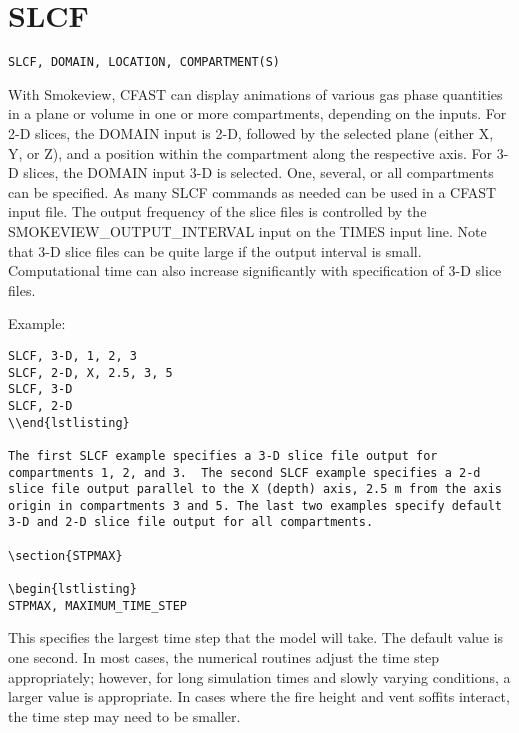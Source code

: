 \section{SLCF}

\begin{lstlisting}
SLCF, DOMAIN, LOCATION, COMPARTMENT(S)
\end{lstlisting}

With Smokeview, CFAST can display animations of various gas phase quantities in a plane or volume in one or more compartments, depending on the inputs. For 2-D slices, the DOMAIN input is 2-D, followed by the selected plane (either X, Y, or Z), and a position within the compartment along the respective axis. For 3-D slices, the DOMAIN input 3-D is selected. One, several, or all compartments can be specified. As many SLCF commands as needed can be used in a CFAST input file.  The output frequency of the slice files is controlled by the SMOKEVIEW\_OUTPUT\_INTERVAL input on the TIMES input line. Note that 3-D slice files can be quite large if the output interval is small. Computational time can also increase significantly with specification of 3-D slice files.

Example:

\begin{lstlisting}
SLCF, 3-D, 1, 2, 3
SLCF, 2-D, X, 2.5, 3, 5
SLCF, 3-D
SLCF, 2-D
\\end{lstlisting}

The first SLCF example specifies a 3-D slice file output for compartments 1, 2, and 3.  The second SLCF example specifies a 2-d slice file output parallel to the X (depth) axis, 2.5 m from the axis origin in compartments 3 and 5. The last two examples specify default 3-D and 2-D slice file output for all compartments.

\section{STPMAX}

\begin{lstlisting}
STPMAX, MAXIMUM_TIME_STEP
\end{lstlisting}

This specifies the largest time step that the model will take. The default value is one second. In most cases, the numerical routines adjust the time step appropriately; however, for long simulation times and slowly varying conditions, a larger value is appropriate. In cases where the fire height and vent soffits interact, the time step may need to be smaller.

